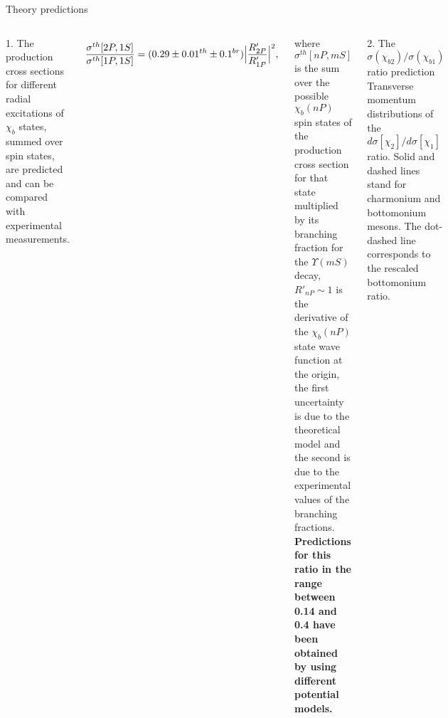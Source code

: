 \begin{frame}{Theory predictions}

\footnotesize

\begin{columns}[t]
1. The production cross sections for different radial excitations of $\chi_b$ states, summed over spin states, 
are predicted and can be compared with experimental measurements.

$$
\frac{\sigma^{th}[2P,1S]}{\sigma^{th}[1P,1S]} = (0.29 \pm 0.01^{th} \pm 0.1^{br}) \Bigl| \frac{R'_{2P}}{R'_{1P}}\Bigr|^2, 
$$

where $\sigma^{th}[nP,mS]$ is the sum over the possible $\chi_b(nP)$ spin
states of the production cross section for that state multiplied by its
branching fraction for the $\Upsilon(mS)$ decay, $R'_{nP} \sim 1$ is the
derivative of the $\chi_b(nP)$ state wave function at the origin, the first
uncertainty is due to the theoretical model and the second is due to the
experimental values of the branching fractions.  \textbf{Predictions for this
ratio in the range between 0.14 and 0.4 have been obtained by using different
potential models.}

2. The $\sigma(\chi_{b2})/\sigma(\chi_{b1})$ ratio prediction
Transverse momentum distributions of the
$d\sigma\left[\chi_{2}\right]/d\sigma[\chi_{1}]$ ratio. Solid and dashed lines
stand for charmonium and bottomonium mesons. The dot-dashed line corresponds to
the rescaled bottomonium ratio.
\end{columns}
\end{frame}